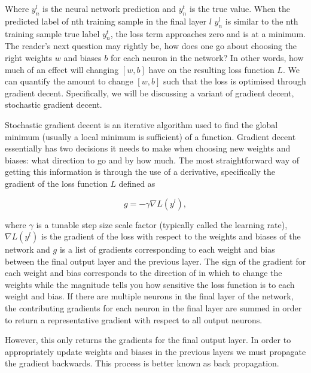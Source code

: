 %
%
Where $y^{l}_n$ is the neural network prediction and $y^{t}_n$ is the true value.
When the predicted label of nth training sample in the final layer $l$ $y^{l}_n$ is similar to the nth training sample true label $y^{t}_n$, the loss term approaches zero and is at a minimum. The reader's next question may rightly be, how does one go about choosing the right weights $w$ and biases $b$ for each neuron in the network? In other words, how much of an effect will changing $[w,b]$ have on the resulting loss function $L$. We can quantify the amount to change $[w,b]$ such that the loss is optimised through gradient decent\cite{1609.04747}. Specifically, we will be discussing a variant of gradient decent, stochastic gradient decent.

%
%
Stochastic gradient decent is an iterative algorithm used to find the global minimum (usually a local minimum is sufficient) of a function. Gradient decent essentially has two decisions it needs to make when choosing new weights and biases: what direction to go and by how much. The most straightforward way of getting this information is through the use of a derivative, specifically the gradient of the loss function $L$ defined as 

\begin{equation}
    g = - \gamma \nabla L(y^{l}),
\end{equation}{}

where $\gamma$ is a tunable step size scale factor (typically called the learning rate), $\nabla L(y^{l})$ is the gradient of the loss with respect to the weights and biases of the network and $g$ is a list of gradients corresponding to each weight and bias between the final output layer and the previous layer. The sign of the gradient for each weight and bias corresponds to the direction of in which to change the weights while the magnitude tells you how sensitive the loss function is to each weight and bias. If there are multiple neurons in the final layer of the network, the contributing gradients for each neuron in the final layer are summed in order to return a representative gradient with respect to all output neurons.

However, this only returns the gradients for the final output layer. In  order to appropriately update weights and biases in the previous layers we must propagate the gradient backwards. This process is better known as back propagation.

